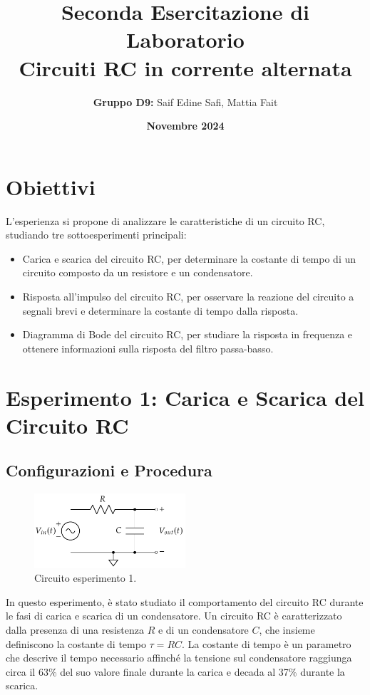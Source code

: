 \documentclass[a4paper,12pt]{article}
\title{\Large\textbf{Seconda Esercitazione di Laboratorio}\\ \vspace{0.5em} \large Circuiti RC in corrente alternata}
\author{\textbf{Gruppo D9:} Saif Edine Safi, Mattia Fait}
\date{\textbf{Novembre 2024}}
\begin{document}
\maketitle

\tableofcontents %
\newpage

\section{Obiettivi}
L'esperienza si propone di analizzare le caratteristiche di un circuito RC, studiando tre sottoesperimenti principali:
\begin{itemize}
    \item Carica e scarica del circuito RC, per determinare la costante di tempo di un circuito composto da un resistore e un condensatore.
    \item Risposta all'impulso del circuito RC, per osservare la reazione del circuito a segnali brevi e determinare la costante di tempo dalla risposta.
    \item Diagramma di Bode del circuito RC, per studiare la risposta in frequenza e ottenere informazioni sulla risposta del filtro passa-basso.
\end{itemize}


\section{Esperimento 1: Carica e Scarica del Circuito RC}
\subsection{Configurazioni e Procedura}

\begin{figure}[h!]
    \centering
    \includegraphics[width=0.5\textwidth]{assets/I.png}
    \caption{Circuito esperimento 1.}
    \label{fig:example}
\end{figure}

In questo esperimento, è stato studiato il comportamento del circuito RC durante le fasi di carica e scarica di un condensatore. Un circuito RC è caratterizzato dalla presenza di una resistenza \( R \) e di un condensatore \( C \), che insieme definiscono la costante di tempo \(\tau = RC\). La costante di tempo è un parametro che descrive il tempo necessario affinché la tensione sul condensatore raggiunga circa il 63\% del suo valore finale durante la carica e decada al 37\% durante la scarica.
\end{document}
